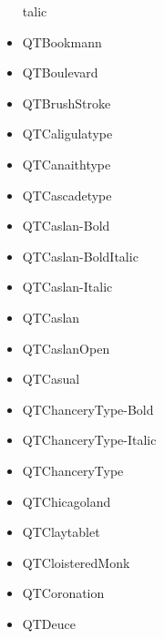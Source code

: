 \documentclass[12pt]{article}
\begin{document}
\begin{itemize}
talic\item QTBookmann\item QTBoulevard\item QTBrushStroke\item QTCaligulatype\item QTCanaithtype\item QTCascadetype\item QTCaslan-Bold\item QTCaslan-BoldItalic\item QTCaslan-Italic\item QTCaslan\item QTCaslanOpen\item QTCasual\item QTChanceryType-Bold\item QTChanceryType-Italic\item QTChanceryType\item QTChicagoland\item QTClaytablet\item QTCloisteredMonk\item QTCoronation\item QTDeuce\
\end{itemize}
\end{document}
